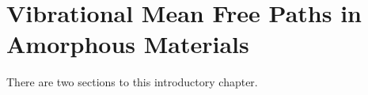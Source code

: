 \chapter{Vibrational Mean Free Paths in Amorphous Materials}
There are two sections to this introductory chapter.

